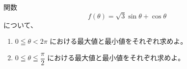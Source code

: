 \documentclass[8pt,dvipdfmx]{article}[b5paper]
\begin{document}
\begin{tcolorbox}[title=数学\textcircled{\scriptsize 3} 2-3 AB]
関数 \[f(\theta)=\sqrt{3}\sin\theta+\cos\theta\] について、
\begin{enumerate}[(1)]
\item $0\leqq\theta<2\pi$ における最大値と最小値をそれぞれ求めよ。
\item $0\leqq\theta\leqq\dfrac{\pi}{2}$ における最大値と最小値をそれぞれ求めよ。
\end{enumerate}
\end{tcolorbox}




\end{document}
